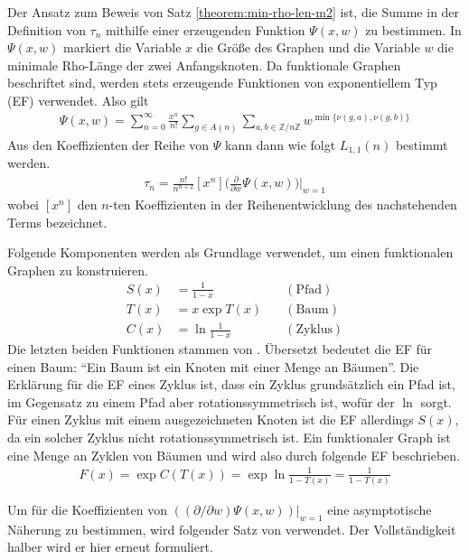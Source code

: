 \documentclass[a4paper, 10pt, ngerman]{article}
\newcommand{\Z}{\mathbb{Z}}
\begin{document}
Der Ansatz zum Beweis von Satz \ref{theorem:min-rho-len-m2} ist, die Summe in der Definition von $\tau_n$ mithilfe einer erzeugenden Funktion $\Psi(x, w)$ zu bestimmen. In $\Psi(x, w)$ markiert die Variable $x$ die Größe des Graphen und die Variable $w$ die minimale Rho-Länge der zwei Anfangsknoten. Da funktionale Graphen beschriftet sind, werden stets erzeugende Funktionen von exponentiellem Typ (EF) verwendet. Also gilt
\begin{align}
    \Psi(x, w)
    = \sum_{n = 0}^\infty \frac {x^n}{n!} \sum_{g \in A(n)}
    \sum_{a, b \in \Z/n\Z} w^{\min\{\nu(g, a), \nu(g, b)\}}
    \label{psi-definition}
\end{align}
Aus den Koeffizienten der Reihe von $\Psi$ kann dann wie folgt $L_{1, 1}(n)$ bestimmt werden.
\begin{align*}
    \tau_n = \frac {n!}{n^{n + 2}} [x^n] \Bigg (\frac {\partial} {\partial w} \Psi(x, w) \Bigg ) \Bigg \vert_{w = 1}
\end{align*}
wobei $[x^n]$ den $n$-ten Koeffizienten in der Reihenentwicklung des nachstehenden Terms bezeichnet.

Folgende Komponenten werden als Grundlage verwendet, um einen funktionalen Graphen zu konstruieren.
\begin{align*}
    S(x) & = \frac 1 {1 - x}       & \quad (\text{Pfad})   \\
    T(x) & = x \exp T(x)           & \quad (\text{Baum})   \\
    C(x) & = \ln \frac {1} {1 - x} & \quad (\text{Zyklus})
\end{align*}
Die letzten beiden Funktionen stammen von \cite{fo90}. Übersetzt bedeutet die EF für einen Baum: "`Ein Baum ist ein Knoten mit einer Menge an Bäumen"'. Die Erklärung für die EF eines Zyklus ist, dass ein Zyklus grundsätzlich ein Pfad ist, im Gegensatz zu einem Pfad aber rotationssymmetrisch ist, wofür der $\ln$ sorgt. Für einen Zyklus mit einem ausgezeichneten Knoten ist die EF allerdings $S(x)$, da ein solcher Zyklus nicht rotationssymmetrisch ist. Ein funktionaler Graph ist eine Menge an Zyklen von Bäumen und wird also durch folgende EF beschrieben.
\begin{align*}
    F(x) = \exp C(T(x)) = \exp \ln \frac 1 {1 - T(x)} = \frac 1 {1 - T(x)}
\end{align*}

Um für die Koeffizienten von $((\partial / \partial w) \Psi(x, w)) |_{w = 1}$ eine asymptotische Näherung zu bestimmen, wird folgender Satz von \cite{fo90} verwendet. Der Vollständigkeit halber wird er hier erneut formuliert.
\end{document}
